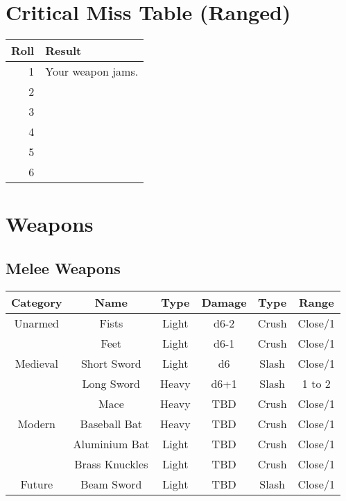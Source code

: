 \section{Critical Miss Table (Ranged)}
\begin{center}
\begin{tabular}{r | l}
    \textbf{Roll} & \textbf{Result}\\\hline
    1 & Your weapon jams.\\
    2 &\\
    3 &\\
    4 &\\
    5 &\\
    6 &\\
\end{tabular}
\end{center}

\section{Weapons} \label{sec:weapons}
\subsection{Melee Weapons}
\begin{center}
\begin{tabular}{c | c | c | c | c | c}
    \textbf{Category} & \textbf{Name} & \textbf{Type} & \textbf{Damage} & \textbf{Type} & \textbf{Range} \\\hline
    Unarmed  & Fists          & Light & d6-2  & Crush & Close/1\\
             & Feet           & Light & d6-1  & Crush & Close/1 \\\hline
    Medieval & Short Sword    & Light & d6    & Slash & Close/1 \\
             & Long Sword     & Heavy & d6+1  & Slash & 1 to 2 \\
             & Mace           & Heavy &  TBD  & Crush & Close/1\\\hline
    Modern   & Baseball Bat   & Heavy &  TBD  & Crush & Close/1\\
             & Aluminium Bat  & Light &  TBD  & Crush & Close/1\\
             & Brass Knuckles & Light &  TBD  & Crush & Close/1\\\hline
    Future   & Beam Sword     & Light &  TBD  & Slash & Close/1
\end{tabular}
\end{center}

